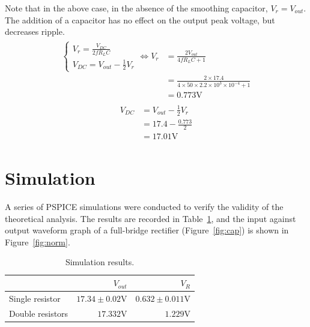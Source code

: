 \documentclass[12pt]{article}
\begin{document}
Note that in the above case, in the absence of the smoothing capacitor, $V_r=V_{out}$. The addition of a capacitor has no effect on the output peak voltage, but decreases ripple.
\begin{align}
\begin{split}
  \begin{cases}
  V_{r}=\frac{V_{DC}}{2f R_L C}\\
  V_{DC}=V_{out}-\frac{1}{2}V_r
  \end{cases}
  \Leftrightarrow
  V_{r}&=\frac{2V_{out}}{4fR_LC+1}\\
  &=\frac{2\times17.4}{4\times50\times2.2\times10^{3}\times10^{-4}+1}\\
  &=0.773\mathrm{V}
\label{eq:cap}
\end{split}
\end{align}
\begin{align}
  \begin{split}
    V_{DC}&=V_{out}-\frac{1}{2}V_r\\
    &=17.4-\frac{0.773}{2}\\
    &=17.01\mathrm{V}
  \end{split}
  \label{eq:capdc}
\end{align}

\section{Simulation}
\label{sec:sim}
A series of PSPICE simulations were conducted to verify the validity of the theoretical analysis. The results are recorded in Table~\ref{tab:sim}, and the input against output waveform graph of a full-bridge rectifier (Figure~\ref{fig:cap}) is shown in Figure~\ref{fig:norm}.
\begin{table}[h!]
\centering
\caption{Simulation results.}  
\begin{tabular}{|l|r|r|}
\hline
&$V_{out}$&$V_R$\\ \hline
Single resistor&$17.34\pm0.02\mathrm{V}$&$0.632\pm0.011\mathrm{V}$\\ \hline
Double resistors&$17.332\mathrm{V}$&$1.229\mathrm{V}$\\ \hline
\end{tabular}
\label{tab:sim}
\end{table}
\end{document}
